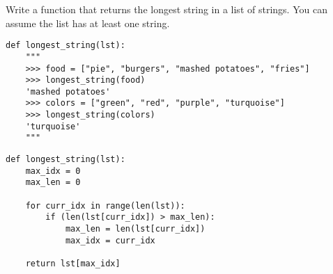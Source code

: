 \begin{blocksection}
\question Write a function that returns the longest string in a list of strings. You can assume the list has at least one string.

\begin{lstlisting}
def longest_string(lst):
    """
    >>> food = ["pie", "burgers", "mashed potatoes", "fries"]
    >>> longest_string(food)
    'mashed potatoes'
    >>> colors = ["green", "red", "purple", "turquoise"]
    >>> longest_string(colors)
    'turquoise'
    """

\end{lstlisting}

\begin{solution}[1.5in]
\begin{lstlisting}
def longest_string(lst):
    max_idx = 0
    max_len = 0
    
    for curr_idx in range(len(lst)):
        if (len(lst[curr_idx]) > max_len):
            max_len = len(lst[curr_idx])
            max_idx = curr_idx
            
    return lst[max_idx]
    
    
\end{lstlisting}
\end{solution}
\end{blocksection}
